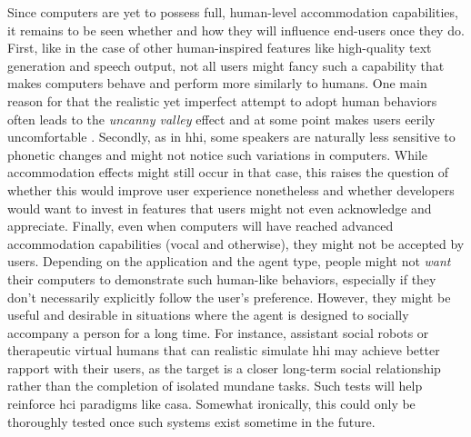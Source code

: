 Since computers are yet to possess full, human-level accommodation capabilities, it remains to be seen whether and how they will influence end-users once they do.
First, like in the case of other human-inspired features like high-quality text generation and speech output, not all users might fancy such a capability that makes computers behave and perform more similarly to humans.
One main reason for that the realistic yet imperfect attempt to adopt human behaviors often leads to the \emph{uncanny valley} effect \citep{Mori1970uncanny} and at some point makes users eerily uncomfortable \citep[cf.\ Figure 1 in][]{Macdorman2006subjective}.
Secondly, as in \ac{hhi}, some speakers are naturally less sensitive to phonetic changes and might not notice such variations in computers.
While accommodation effects might still occur in that case, this raises the question of  whether this would improve user experience nonetheless and whether developers would want to invest in features that users might not even acknowledge and appreciate.
Finally, even when computers will have reached advanced accommodation capabilities (vocal and otherwise), they might not be accepted by users.
Depending on the application and the agent type, people might not \emph{want} their computers to demonstrate such human-like behaviors, especially if they don't necessarily explicitly follow the user's preference.
However, they might be useful and desirable in situations where the agent is designed to socially accompany a person for a long time.
For instance, assistant social robots or therapeutic virtual humans that can realistic simulate \ac{hhi} may achieve better rapport with their users, as the target is a closer long-term social relationship rather than the completion of isolated mundane tasks.
Such tests will help reinforce \ac{hci} paradigms like \ac{casa}.
Somewhat ironically, this could only be thoroughly tested once such systems exist sometime in the future.
